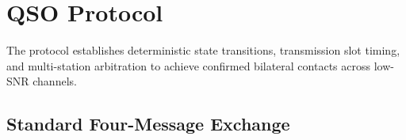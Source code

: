 %
%
%
%
%
%


\section{QSO Protocol}
\label{sec:qso}

The \LQ{} protocol establishes deterministic state transitions, transmission slot timing, and multi-station arbitration to achieve confirmed bilateral contacts across low-SNR channels.

\subsection{Standard Four-Message Exchange}
\label{sec:qso:standard}

